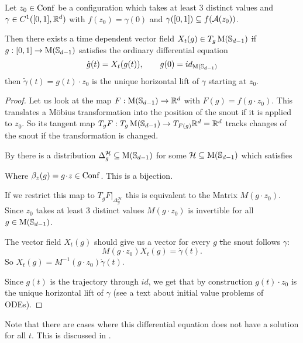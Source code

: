 \begin{theorem}
    Let $z_0 \in \operatorname{Conf}$ be a configuration which takes at least 3 distinct values and
    $\gamma \in C^{1}({[0,1]}, {\mathbb{R}^d})$ with $f(z_0) = \gamma(0)$ and
    $\gamma([0,1]) \subseteq f(\mathcal{A}(z_0))$.
    
    Then there exists a time dependent vector field $X_t(g) \in T_g\operatorname{M}(\mathbb{S}_{d-1})$ \st if
    $g : [0,1] \rightarrow \operatorname{M}(\mathbb{S}_{d-1})$ satisfies the ordinary differential equation
        \[ \dot{g}(t) = X_t(g(t)), \qquad g(0) = id_{\operatorname{M}(\mathbb{S}_{d-1})} \]
    then $\widetilde{\gamma}(t) = g(t) \cdot z_0$ is the unique horizontal lift of
    $\gamma$ starting at $z_0$.
    
    \begin{proof}
        Let us look at the map $F : \operatorname{M}(\mathbb{S}_{d-1}) \rightarrow \mathbb{R}^d$ with $F(g) = f(g \cdot z_0)$.
        This translates a Möbius transformation into the position of the snout if it is
        applied to $z_0$. So its tangent map
        $T_gF : T_g\operatorname{M}(\mathbb{S}_{d-1}) \rightarrow T_{F(g)}\mathbb{R}^d = \mathbb{R}^d$ tracks changes of the snout
        if the transformation is changed.
        
        By \cite[p. 38]{Rodriguez06} there is a distribution
        $\Delta_g^{\mathcal{H}} \subseteq \operatorname{M}(\mathbb{S}_{d-1})$ for some $\mathcal{H} \subseteq \operatorname{M}(\mathbb{S}_{d-1})$
        which satisfies
            \begin{center}
            \end{center}
        Where $\beta_z(g) = g \cdot z \in \Conf$. This is a bijection.

        If we restrict this map to $T_gF|_{\Delta_g^{\mathcal{H}}}$
        this is equivalent to the Matrix $M(g \cdot z_0)$.
        Since $z_0$ takes at least 3 distinct values $M(g \cdot z_0)$
        is invertible for all $g \in \operatorname{M}(\mathbb{S}_{d-1})$.
        
        The vector field $X_t(g)$ should give us a vector for every $g$ \st the snout
        follows $\gamma$:
            \[ M(g \cdot z_0) X_t(g) = \dot{\gamma}(t) . \]
        So $X_t(g) = M^{-1}(g \cdot z_0)\dot{\gamma}(t)$.
        
        Since $g(t)$ is the trajectory through $id$, we get that by construction
        $g(t) \cdot z_0$ is the unique horizontal lift of $\gamma$
        (see a text about initial value problems of ODEs).
    \end{proof}
\end{theorem}

\begin{remark}
    Note that there are cases where this differential equation does not have a solution
    for all $t$. This is discussed in \cite[Section 5]{Rodriguez07}.
\end{remark}

